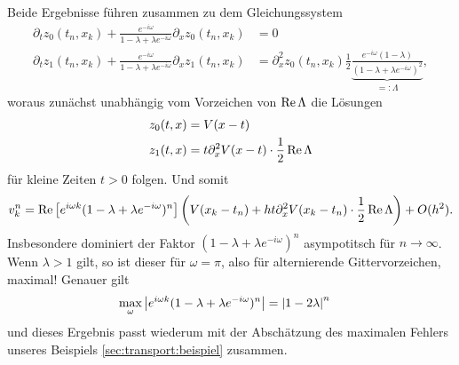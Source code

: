 Beide Ergebnisse führen zusammen zu dem Gleichungssystem
\begin{align}
\partial_t z_0(t_n, x_k) + \frac{e^{- i \omega}}{1 - \lambda + \lambda e^{-i \omega}} \partial_x z_0(t_n, x_k) &= 0\\
\partial_t z_1(t_n, x_k) + \frac{e^{- i \omega}}{1 - \lambda + \lambda e^{-i \omega}} \partial_x z_1(t_n, x_k)
&= \partial^2_x z_0(t_n, x_k) \frac{1}{2} \underbrace{\frac{ e^{-i \omega} (1- \lambda)}{(1 - \lambda + \lambda e^{-i \omega})^2}}_{=: \Lambda},
\end{align}
woraus zunächst unabhängig vom Vorzeichen von $\operatorname{Re} \Lambda$ die Lösungen
\begin{align}
z_0(t,x) &= V(x - t)\\
z_1(t,x) &= t \partial^2_x V(x - t) \cdot \frac 12 \operatorname{Re} \Lambda
\end{align}
für kleine Zeiten $t > 0$ folgen. Und somit
\begin{align*}
v^n_k = \operatorname{Re} \left[ e^{i \omega k} (1 - \lambda + \lambda e^{-i \omega})^n \right] \left( V(x_k - t_n) + h t \partial^2_x V(x_k - t_n) \cdot \frac 12 \operatorname{Re} \Lambda \right) + O(h^2).
\end{align*}
Insbesondere dominiert der Faktor $(1 - \lambda + \lambda e^{-i \omega})^n$ asympotitsch für $n \to \infty$.
Wenn $\lambda > 1$ gilt, so ist dieser für $\omega = \pi$, also für alternierende Gittervorzeichen, maximal! Genauer gilt
\begin{align}
\max_\omega \left|  e^{i \omega k} (1 - \lambda + \lambda e^{-i \omega})^n  \right| &= \left| 1 - 2 \lambda \right|^n
\end{align}
und dieses Ergebnis passt wiederum mit der Abschätzung des maximalen Fehlers unseres Beispiels \ref{sec:transport:beispiel} zusammen.
